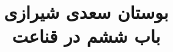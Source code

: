 \documentclass[14pt,b5paper]{article}
\begin{document}
\title{\Huge بوستان سعدی شیرازی \\
باب ششم در قناعت}
\author{ }
\date{ }
\maketitle
\newpage
\tableofcontents
\newpage

\newpage

\newpage

\newpage

\newpage

\newpage

\newpage

\newpage

\newpage

\newpage

\newpage

\newpage

\newpage

\newpage

\newpage

\newpage
\end{document}
